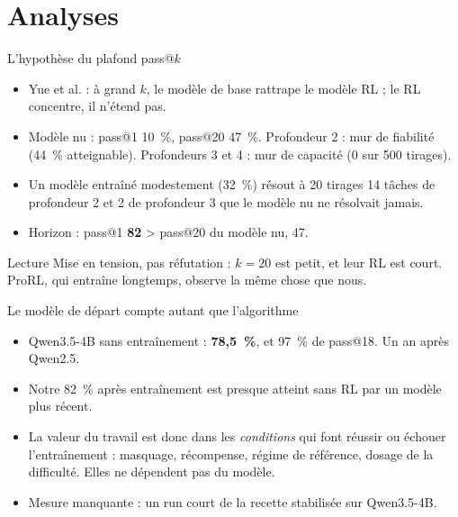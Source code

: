 \documentclass[aspectratio=169,11pt]{beamer}
\begin{document}
\section{Analyses}

\begin{frame}{L'hypothèse du plafond pass@$k$}
\begin{itemize}
    \item Yue et al. : à grand $k$, le modèle de base rattrape le modèle RL ; le RL concentre, il n'étend pas.
    \item Modèle nu : pass@1 10~\%, pass@20 47~\%. Profondeur 2 : mur de fiabilité (44~\% atteignable). Profondeurs 3 et 4 : mur de capacité (0 sur 500 tirages).
    \item Un modèle entraîné modestement (32~\%) résout à 20 tirages 14 tâches de profondeur 2 et 2 de profondeur 3 que le modèle nu ne résolvait jamais.
    \item Horizon : pass@1 \textbf{82} > pass@20 du modèle nu, 47.
\end{itemize}
\begin{block}{Lecture}
Mise en tension, pas réfutation : $k=20$ est petit, et leur RL est court. ProRL, qui entraîne longtemps, observe la même chose que nous.
\end{block}
\end{frame}

\begin{frame}{Le modèle de départ compte autant que l'algorithme}
\begin{itemize}
    \item Qwen3.5-4B sans entraînement : \textbf{78,5~\%}, et 97~\% de pass@18. Un an après Qwen2.5.
    \item Notre 82~\% après entraînement est presque atteint sans RL par un modèle plus récent.
    \item La valeur du travail est donc dans les \emph{conditions} qui font réussir ou échouer l'entraînement : masquage, récompense, régime de référence, dosage de la difficulté. Elles ne dépendent pas du modèle.
    \item Mesure manquante : un run court de la recette stabilisée sur Qwen3.5-4B.
\end{itemize}
\end{frame}
\end{document}
